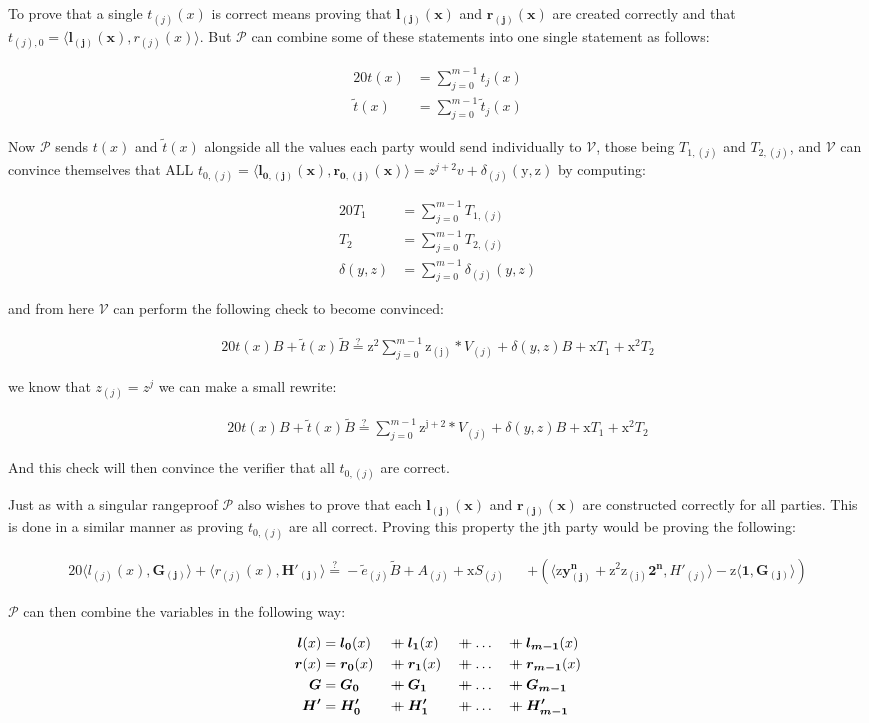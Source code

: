 \documentclass{article}
\newcommand{\eq}[1]{\begin{alignat*}{20}#1\end{alignat*}}
\renewcommand{\vec}[1]{\boldsymbol{#1}}
\newcommand{\ran}[1]{\mathrm{#1}}
\newcommand{\vecran}[1]{\mathbf{#1}}
\newcommand{\V}{\mathcal{V}}
\renewcommand{\P}{\mathcal{P}}
\newcommand\concat{\mathbin{+\mkern-10mu+}} %
\newcommand{\dotp}[2]{\langle #1, #2 \rangle}
\begin{document}
To prove that a single $t_{(j)}(x)$ is correct means proving that $\vec{l_{(j)}(x)}$ and $\vec{r_{(j)}(x)}$ are created correctly and that $t_{(j), 0} = \dotp{\vec{l_{(j)}(x)}}{r_{(j)}(x)}$. But $\P$ can combine some of these statements into one single statement as follows: 

\eq{
	t(x) &= \sum^{m-1}_{j = 0} t_{j}(x)\\
	\widetilde{t}(x) &= \sum^{m-1}_{j = 0} \widetilde{t}_{j}(x)
}

Now $\P$ sends $t(x)$ and $\widetilde{t}(x)$ alongside all the values each party would send individually to $\V$, those being $T_{1,(j)}$ and $T_{2,(j)}$, and $\V$ can convince themselves that ALL $t_{0,(j)} = \dotp{\vec{l_{0,(j)}(x)}}{\vec{r_{0,(j)}(x)}} = z^{j+2}v + \delta_{(j)}(\ran{y}, \ran{z})$ by computing:

\eq{
	T_1 &= \sum^{m-1}_{j = 0} T_{1,(j)}\\
	T_2 &= \sum^{m-1}_{j = 0} T_{2,(j)}\\
	\delta(y,z) &= \sum^{m-1}_{j = 0} \delta_{(j)}(y,z)
}

and from here $\V$ can perform the following check to become convinced: 

\eq{
	t(x)B + \widetilde{t}(x)\widetilde{B} \stackrel{?}{=} \ran{z^2}\sum^{m-1}_{j = 0} \ran{z_{(j)}}*V_{(j)} + \delta(y,z)B + \ran{x}T_1 + \ran{x^2}T_2
}

we know that $z_{(j)} = z^j$ we can make a small rewrite:

\eq{
	t(x)B + \widetilde{t}(x)\widetilde{B} \stackrel{?}{=} \sum^{m-1}_{j = 0} \ran{z^{j+2}}*V_{(j)} + \delta(y,z)B + \ran{x}T_1 + \ran{x^2}T_2
}

And this check will then convince the verifier that all $t_{0,(j)}$ are correct.

Just as with a singular rangeproof $\P$ also wishes to prove that each $\vec{l_{(j)}(x)}$ and $\vec{r_{(j)}(x)}$ are constructed correctly for all parties. This is done in a similar manner as proving $t_{0,(j)}$ are all correct. Proving this property the jth party would be proving the following:

\eq{
	\dotp{l_{(j)}(x)}{\vec{G_{(j)}}} + \dotp{r_{(j)}(x)}{\vec{H'_{(j)}}} \stackrel{?}{=} -\widetilde{e}_{(j)}\widetilde{B} + A_{(j)} + \ran{x}S_{(j)} &&+ (\dotp{\ran{z}\vecran{y^n_{(j)}} + \ran{z^2}\ran{z_{(j)}}\vec{2^n}}{H'_{(j)}} - \ran{z}\dotp{\vec{1}}{\vec{G_{(j)}}})
}

$\P$ can then combine the variables in the following way:

\eq{
	\vec{l}(x) &= \vec{l_0}(x) &&\concat \vec{l_1}(x) &&\concat \dots &&\concat \vec{l_{m-1}}(x)\\
	\vec{r}(x) &= \vec{r_0}(x) &&\concat \vec{r_1}(x) &&\concat \dots &&\concat \vec{r_{m-1}}(x)\\
	\vec{G} &= \vec{G_0} &&\concat \vec{G_1} &&\concat \dots &&\concat \vec{G_{m-1}}\\
	\vec{H'} &= \vec{H'_0} &&\concat \vec{H'_1} &&\concat \dots &&\concat \vec{H'_{m-1}}
}
\end{document}
